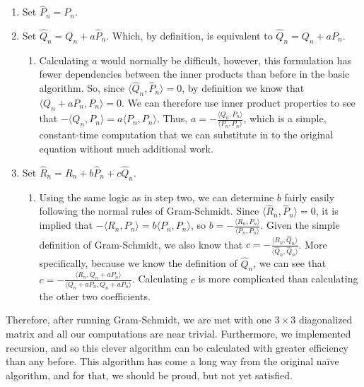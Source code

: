 \documentclass[letterpaper, 12pt]{article}
\begin{document}
\begin{enumerate}
	\vspace*{-4mm}
	\item Set $\hat{P}_n = P_n$.
	\vspace*{-3mm}
	\item Set $\hat{Q}_n = Q_n + a\hat{P}_n$. Which, by definition, is equivalent to $\hat{Q}_n = Q_n + aP_n$.
	\begin{enumerate}
		\vspace*{-4mm}
		\item[] Calculating $a$ would normally be difficult, however, this formulation has fewer dependencies between the inner products than before in the basic algorithm. So, since  $\langle \hat{Q}_n, \hat{P}_n\rangle = 0$, by definition we know that $\langle Q_n+aP_n, P_n\rangle = 0$. We can therefore use inner product properties to see that $-\langle Q_n, P_n\rangle = a\langle P_n, P_n\rangle$. Thus, $a = -\frac{\langle Q_n, P_n\rangle}{\langle P_n, P_n\rangle}$, which is a simple, constant-time computation that we can substitute in to the original equation without much additional work.
	\end{enumerate}
	\vspace*{-5mm}
	\item Set $ \hat{R}_n =  R_n + b\hat{P}_n + c\hat{Q}_n$.
	\begin{enumerate}
		\vspace*{-4mm}
		\item[] Using the same logic as in step two, we can determine $b$ fairly easily following the normal rules of Gram-Schmidt. Since $\langle \hat{R}_n, \hat{P}_n\rangle =0$, it is implied that $-\langle R_n, P_n\rangle = b\langle P_n, P_n\rangle $, so $b = -\frac{\langle R_n, P_n\rangle}{\langle P_n, P_n\rangle}$.
		Given the simple definition of Gram-Schmidt, we also know that $c=-\frac{\langle R_n, \hat{Q}_n\rangle}{\langle \hat{Q}_n, \hat{Q}_n\rangle}$. More specifically, because we know the definition of $\hat{Q}_n$, we can see that $c = -\frac{\langle R_n, Q_n +aP_n\rangle}{\langle Q_n +aP_n, Q_n +aP_n\rangle}$. Calculating $c$ is more complicated than calculating the other two coefficients.
	\end{enumerate}
\end{enumerate}

\vspace*{-4mm}
\noindent Therefore, after running Gram-Schmidt, we are met with one $3\times 3$ diagonalized matrix and all our computations are near trivial. Furthermore, we implemented recursion, and so this clever algorithm can be calculated with greater efficiency than any before. This algorithm has come a long way from the original na\"ive algorithm, and for that, we should be proud, but not yet satisfied.
\end{document}
